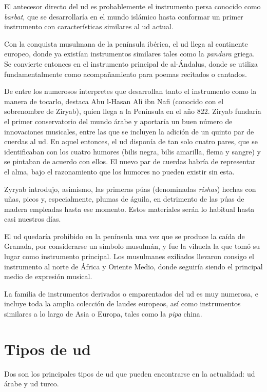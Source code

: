 El antecesor directo del ud es probablemente el instrumento persa conocido como \emph{barbat}, que se desarrollaría en el mundo islámico hasta conformar un primer instrumento con características similares al ud actual.

Con la conquista musulmana de la península ibérica, el ud llega al continente europeo, donde ya existían instrumentos similares tales como la \emph{pandura} griega. Se convierte entonces en el instrumento principal de al-Ándalus, donde se utiliza fundamentalmente como acompañamiento para poemas recitados o cantados.

De entre los numerosos interpretes que desarrollan tanto el instrumento como la manera de tocarlo, destaca Abu l-Hasan Ali ibn Nafi (conocido con el sobrenombre de Ziryab), quien llega a la Península en el año 822. Ziryab fundaría el primer conservatorio del mundo árabe y aportaría un buen número de innovaciones musicales, entre las que se incluyen la adición de un quinto par de cuerdas al ud. En aquel entonces, el ud disponía de tan solo cuatro pares, que se identificaban con los cuatro humores (bilis negra, bilis amarilla, flema y sangre) y se pintaban de acuerdo con ellos. El nuevo par de cuerdas habría de representar el alma, bajo el razonamiento que los humores no pueden existir sin esta.

Zyryab introdujo, asimismo, las primeras púas (denominadas \emph{rishas}) hechas con uñas, picos y, especialmente, plumas de águila, en detrimento de las púas de madera empleadas hasta ese momento. Estos materiales serán lo habitual hasta casi nuestros días.

El ud quedaría prohibido en la península una vez que se produce la caída de Granada, por considerarse un símbolo musulmán, y fue la vihuela la que tomó su lugar como instrumento principal. Los musulmanes exiliados llevaron consigo el instrumento al norte de África y Oriente Medio, donde seguiría siendo el principal medio de expresión musical.

La familia de instrumentos derivados o emparentados del ud es muy numerosa, e incluye toda la amplia colección de laudes europeos, así como instrumentos similares a lo largo de Asia o Europa, tales como la \emph{pipa} china.

\section{Tipos de ud}

Dos son los principales tipos de ud que pueden encontrarse en la actualidad: ud árabe y ud turco.

